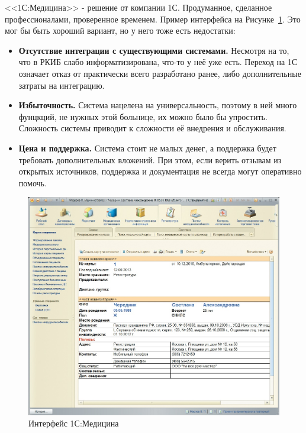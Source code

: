 \documentclass[a4paper,article]{article}
\begin{document}
        <<1С:Медицина>> - решение от компании 1С. Продуманное, сделанное профессионалами, проверенное временем. Пример интерфейса на Рисунке~\ref{fig:Интерфейс 1С:Медицина}. Это мог бы быть хороший вариант, но у него тоже есть недостатки:

        \begin{itemize}[nolistsep]
            \item \textbf{Отсутствие интеграции с существующими системами.} Несмотря на то, что в РКИБ слабо информатизирована, что-то у неё уже есть. Переход на 1С означает отказ от практически всего разработано ранее, либо дополнительные затраты на интеграцию.
            \item \textbf{Избыточность.} Система нацелена на универсальность, поэтому в ней много фунцкций, не нужных этой больнице, их можно было бы упростить. Сложность системы приводит к сложности её внедрения и обслуживания.
            \item \textbf{Цена и поддержка.} Система стоит не малых денег, а поддержка будет требовать дополнительных вложений. При этом, если верить отзывам из открытых источников, поддержка и документация не всегда могут оперативно помочь.
        \end{itemize}

        \begin{figure}[h]

            \centering

            \includegraphics[width=0.8\linewidth]{Интерфейс 1С:Медицина.png}

            \caption{\centering Интерфейс 1С:Медицина}

            \label{fig:Интерфейс 1С:Медицина}

        \end{figure}
\end{document}
